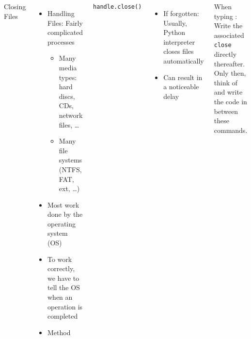 \begin{frame}[fragile]
%
\begin{columns}[T]
\begin{Large}
	{Closing Files}
	\vspace{6pt}
\end{Large}
%
\begin{itemize}
\item Handling Files: Fairly complicated processes
	\begin{itemize}
	\item Many media types: hard discs, CDs, network files, \ldots
	\item Many file systems (NTFS, FAT, ext, \ldots)
	\end{itemize}
\item Most work done by the operating system (OS)
\item To work correctly, we have to tell the OS when an operation is completed
\item[\Thus] Method 
\end{itemize}
%
\begin{codebox}
\begin{verbatim}
handle.close()
\end{verbatim}
\end{codebox}
%
\begin{itemize}
\item If forgotten: Usually, Python interpreter closes files automatically
\item Can result in a noticeable delay
\end{itemize}
%
\begin{hintbox}
\small
When typing : Write the associated \texttt{close} directly thereafter. Only then, think of and write the code in between these commands.
\end{hintbox}
\end{columns}
%
\end{frame}



